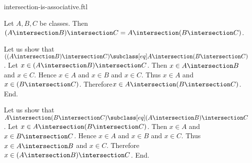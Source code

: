 \documentclass{article}
\begin{document}
\begin{smodule}[creators={Marcel Schütz}]{intersection-is-associative.ftl}

  \begin{fproposition*}[label=3587256308727808]
    Let $A, B, C$ be classes.
    Then $(A \intersection B) \intersection C = A \intersection (B \intersection C)$.
  \end{fproposition*}
  \begin{fproof}
    Let us show that $((A \intersection B) \intersection C) \subclass[eq] A \intersection (B \intersection C)$. %
      Let $x \in (A \intersection B) \intersection C$.
      Then $x \in A \intersection B$ and $x \in C$.
      Hence $x \in A$ and $x \in B$ and $x \in C$.
      Thus $x \in A$ and $x \in (B \intersection C)$.
      Therefore$ x \in A \intersection (B \intersection C)$.
    End.

    Let us show that $A \intersection (B \intersection C) \subclass[eq] (A \intersection B) \intersection C$.
      Let $x \in A \intersection (B \intersection C)$.
      Then $x \in A$ and $x \in B \intersection C$.
      Hence $x \in A$ and $x \in B$ and $x \in C$.
      Thus $x \in A \intersection B$ and $x \in C$.
      Therefore $x \in (A \intersection B) \intersection C$.
    End.
  \end{fproof}
\end{smodule}
\end{document}
